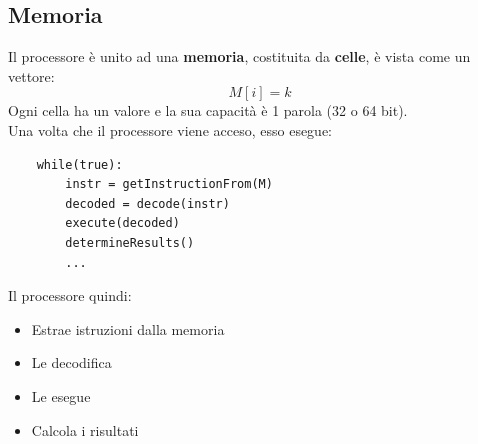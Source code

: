 \documentclass[12pt,a4paper]{article}
\begin{document}
\subsection{Memoria}
Il processore è unito ad una \textbf{memoria}, costituita da \textbf{celle}, è vista come un vettore:
\[
M[i] = k
\]
Ogni cella ha un valore e la sua capacità è 1 parola (32 o 64 bit).\\
Una volta che il processore viene acceso, esso esegue:
\begin{lstlisting}
    while(true):
        instr = getInstructionFrom(M)
        decoded = decode(instr)
        execute(decoded)
        determineResults()
        ...
\end{lstlisting}
Il processore quindi:
\begin{itemize}
    \item Estrae istruzioni dalla memoria
    \item Le decodifica
    \item Le esegue
    \item Calcola i risultati
\end{itemize}
\end{document}
